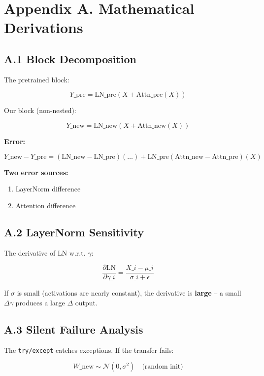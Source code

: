 
\section{Appendix A. Mathematical Derivations}

\subsection{A.1 Block Decomposition}

The pretrained block:

\[
Y\_\text{pre} = \text{LN}\_\text{pre}(X + \text{Attn}\_\text{pre}(X))
\tag{A.1}
\]

Our block (non-nested):

\[
Y\_\text{new} = \text{LN}\_\text{new}(X + \text{Attn}\_\text{new}(X))
\tag{A.2}
\]

\textbf{Error:}

\[
Y\_\text{new} - Y\_\text{pre} = (\text{LN}\_\text{new} - \text{LN}\_\text{pre})(\dots) + \text{LN}\_\text{pre}(\text{Attn}\_\text{new} - \text{Attn}\_\text{pre})(X)
\tag{A.3}
\]

\textbf{Two error sources:}
\begin{enumerate}
\item LayerNorm difference
\item Attention difference

\end{enumerate}
\subsection{A.2 LayerNorm Sensitivity}

The derivative of LN w.r.t. $\gamma$:

\[
\frac{\partial \text{LN}}{\partial \gamma\_i} = \frac{X\_i - \mu\_i}{\sigma\_i + \epsilon}
\tag{A.4}
\]

If $\sigma$ is small (activations are nearly constant), the derivative is 
\textbf{large} -- a small $\Delta \gamma$ produces a large $\Delta$ output.

\subsection{A.3 Silent Failure Analysis}

The \texttt{try/except} catches exceptions. If the transfer fails:

\[
W\_\text{new} \sim \mathcal{N}(0, \sigma^2) \quad \text{(random init)}
\tag{A.5}
\]

